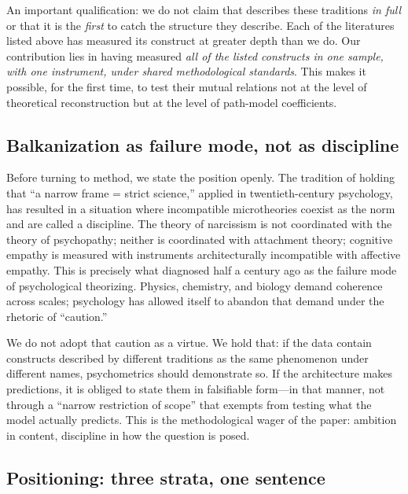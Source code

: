 \medskip
An important qualification: we do not claim that \DEIC{} describes these traditions \emph{in full} or that it is the \emph{first} to catch the structure they describe. Each of the literatures listed above has measured its construct at greater depth than we do. Our contribution lies in having measured \emph{all of the listed constructs in one sample, with one instrument, under shared methodological standards}. This makes it possible, for the first time, to test their mutual relations not at the level of theoretical reconstruction but at the level of path-model coefficients.

\subsection{Balkanization as failure mode, not as discipline}

Before turning to method, we state the position openly. The tradition of holding that ``a narrow frame = strict science,'' applied in twentieth-century psychology, has resulted in a situation where incompatible microtheories coexist as the norm and are called a discipline. The theory of narcissism is not coordinated with the theory of psychopathy; neither is coordinated with attachment theory; cognitive empathy is measured with instruments architecturally incompatible with affective empathy. This is precisely what \citet{meehl1978} diagnosed half a century ago as the failure mode of psychological theorizing. Physics, chemistry, and biology demand coherence across scales; psychology has allowed itself to abandon that demand under the rhetoric of ``caution.''

We do not adopt that caution as a virtue. We hold that: if the data contain constructs described by different traditions as the same phenomenon under different names, psychometrics should demonstrate so. If the \DEIC{} architecture makes predictions, it is obliged to state them in falsifiable form---in that manner, not through a ``narrow restriction of scope'' that exempts from testing what the model actually predicts. This is the methodological wager of the paper: ambition in content, discipline in how the question is posed.

\subsection{Positioning: three strata, one sentence}

